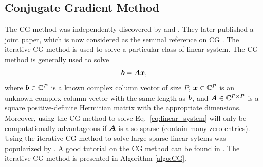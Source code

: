 \documentclass[useAMS,usenatbib]{mn2e}
\newcommand{\bA}{\bmath{A}}
\newcommand{\br}{\bmath{r}}
\newcommand{\bb}{\bmath{b}}
\newcommand{\bx}{\bmath{x}}
\newcommand{\bp}{\bmath{p}}
\begin{document}
\subsection{Conjugate Gradient Method}
\label{sec:conj_grad}
The CG method was independently discovered by \citet{Hestenes1973} and \citet{Stiefel1952}. They later published a joint paper, which is now considered as the seminal
reference on CG \citep{Hestenes1952}. The iterative CG method is used to solve a particular class of linear system. The CG method is generally used to solve
\begin{equation}
\label{eq:linear_system}
\bb = \bA\bx,
\end{equation}
where $\bb\in\mathbb{C}^P$ is a known complex column vector of size $P$, $\bx\in\mathbb{C}^P$ is an unknown complex column vector with the same length as $\bb$, and $\bA\in\mathbb{C}^{P\times P}$ is a square positive-definite Hermitian matrix with the appropriate dimensions.  
Moreover, using the CG method to solve Eq.~\eqref{eq:linear_system} will only be computationally advantageous if $\bA$ is also sparse (contain many zero entries).
Using the iterative CG method to solve large sparse linear sytems was popularized by \citet{Reid1971}. A good tutorial on the CG method can be found in \citep{Shewchuk1994}.
The iterative CG method is presented in Algorithm \ref{algo:CG}. 


\end{document}
